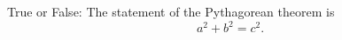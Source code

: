 \documentclass[nooutcomes,noauthor]{ximera}
\author{Bart Snapp}
\begin{document}
\maketitle





\begin{exercise}  
  True or False:
  The statement of the Pythagorean theorem is
  \[
  a^2 + b^2 = c^2.
  \]
\end{exercise}



\begin{exercise}
\end{exercise}



\begin{exercise}
\end{exercise}



\begin{exercise}
\end{exercise}



\begin{exercise}
\end{exercise}




\end{document}
